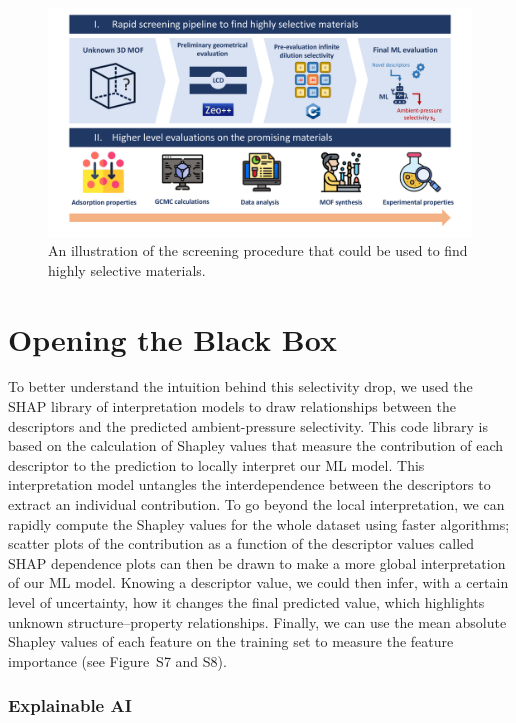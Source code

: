 \documentclass[main]{subfiles}
\begin{document}
\begin{figure}[ht]
\centering
  \includegraphics[width=0.99\linewidth]{figures/4-ml/main/pipeline.pdf}
  \caption{An illustration of the screening procedure that could be used to find highly selective materials.}
  \label{fgr:pipeline}
\end{figure}

\section{Opening the Black Box}

To better understand the intuition behind this selectivity drop, we used the SHAP\autocite{SHAP,molnar2020interpretable} library of interpretation models to draw relationships between the descriptors and the predicted ambient-pressure selectivity. This code library is based on the calculation of Shapley values\autocite{shapley1953value} that measure the contribution of each descriptor to the prediction to locally interpret our ML model. This interpretation model untangles the interdependence between the descriptors to extract an individual contribution. To go beyond the local interpretation, we can rapidly compute the Shapley values for the whole dataset using faster algorithms;\autocite{SHAP} scatter plots of the contribution as a function of the descriptor values called SHAP dependence plots can then be drawn to make a more global interpretation of our ML model. Knowing a descriptor value, we could then infer, with a certain level of uncertainty, how it changes the final predicted value, which highlights unknown structure--property relationships. Finally, we can use the mean absolute Shapley values of each feature on the training set to measure the feature importance (see Figure~S7 and S8).

\subsubsection{Explainable AI}
\end{document}
